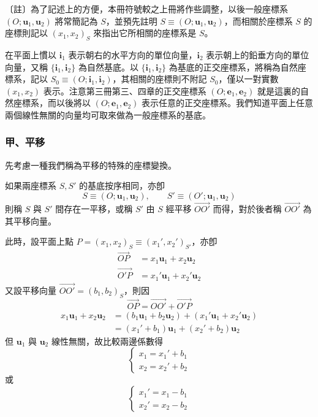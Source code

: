 〔註〕為了記述上的方便，本冊符號較之上冊將作些調整，以後一般座標系 $(O; \mathbf{u}_1, \mathbf{u}_2)$ 將常簡記為 $S$，並預先註明 $S \equiv (O; \mathbf{u}_1, \mathbf{u}_2)$，而相關於座標系 $S$ 的座標則記以 $(x_1, x_2)_S$ 來指出它所相關的座標系是 $S$。

在平面上慣以 $\mathbf{i}_1$ 表示朝右的水平方向的單位向量，$\mathbf{i}_2$ 表示朝上的鉛垂方向的單位向量，又稱 $\{\mathbf{i}_1, \mathbf{i}_2\}$ 為自然基底。以 $\{\mathbf{i}_1, \mathbf{i}_2\}$ 為基底的正交座標系，將稱為自然座標系，記以 $S_0 \equiv (O; \mathbf{i}_1, \mathbf{i}_2)$，其相關的座標則不附記 $S_0$，僅以一對實數 $(x_1, x_2)$ 表示。注意第三冊第三、四章的正交座標系 $(O; \mathbf{e}_1, \mathbf{e}_2)$ 就是這裏的自然座標系，而以後將以 $(O; \mathbf{e}_1, \mathbf{e}_2)$ 表示任意的正交座標系。我們知道平面上任意兩個線性無關的向量均可取來做為一般座標系的基底。

\subsubsection*{甲、平移}

先考慮一種我們稱為平移的特殊的座標變換。

\begin{definition}[定義]
如果兩座標系 $S, S'$ 的基底按序相同，亦卽
\[ S \equiv (O; \mathbf{u}_1, \mathbf{u}_2), \qquad S' \equiv (O'; \mathbf{u}_1, \mathbf{u}_2) \]
則稱 $S$ 與 $S'$ 間存在一平移，或稱 $S'$ 由 $S$ 經平移 $\vec{OO'}$ 而得，對於後者稱 $\vec{OO'}$ 為其平移向量。
\end{definition}

此時，設平面上點 $P = (x_1, x_2)_S \equiv (x_1', x_2')_{S'}$，亦卽
\begin{align*}
\vec{OP} &= x_1 \mathbf{u}_1 + x_2 \mathbf{u}_2 \\
\vec{O'P} &= x_1' \mathbf{u}_1 + x_2' \mathbf{u}_2
\end{align*}
又設平移向量 $\vec{OO'} = (b_1, b_2)_S$，則因
\[ \vec{OP} = \vec{OO'} + \vec{O'P} \]
\begin{align*}
x_1 \mathbf{u}_1 + x_2 \mathbf{u}_2 &= (b_1 \mathbf{u}_1 + b_2 \mathbf{u}_2) + (x_1' \mathbf{u}_1 + x_2' \mathbf{u}_2) \\
&= (x_1' + b_1) \mathbf{u}_1 + (x_2' + b_2) \mathbf{u}_2
\end{align*}
但 $\mathbf{u}_1$ 與 $\mathbf{u}_2$ 線性無關，故比較兩邊係數得
\begin{equation}
\begin{cases}
x_1 = x_1' + b_1 \\
x_2 = x_2' + b_2
\end{cases} \label{eq:b4s-1-2-2}
\end{equation}
或
\begin{equation}
\begin{cases}
x_1' = x_1 - b_1 \\
x_2' = x_2 - b_2
\end{cases} \label{eq:b4s-1-2-3}
\end{equation}

